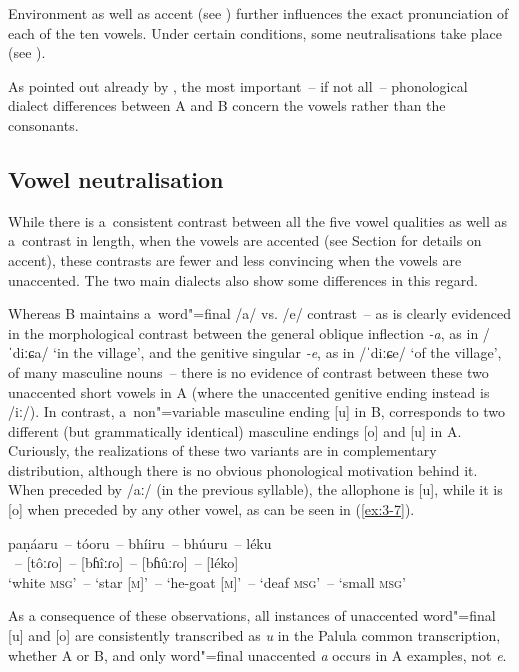 Environment as well as accent (see ) further influences the exact pronunciation of each of the ten vowels. Under certain conditions, some neutralisations take place (see ). 


As pointed out already by \citet[58]{morgenstierne1932}, the most important~-- if not all~-- phonological dialect differences between A and B concern the vowels rather than the consonants. 

\subsection{Vowel neutralisation}
\label{subsec:3-2-2}

While there is a~consistent contrast between all the five vowel qualities as well as a~contrast in length, when the vowels are accented (see Section  for details on accent), these contrasts are fewer and less convincing when the vowels are unaccented. The two main dialects also show some differences in this regard. 


Whereas B maintains a~word"=final /a/ vs. /e/ contrast~-- as is clearly evidenced in the morphological contrast between the general oblique inflection \textit{-a}, as in /ˈdiːɕa/ `in the village', and the genitive singular \textit{-e}, as in /ˈdiːɕe/ `of the village', of many masculine nouns~-- there is no evidence of contrast between these two unaccented short vowels in A (where the unaccented genitive ending instead is /iː/). In contrast, a~non"=variable masculine ending [u] in B, corresponds to two different (but grammatically identical) masculine endings [o] and [u] in A. Curiously, the realizations of these two variants are in complementary distribution, although there is no obvious phonological motivation behind it. When preceded by /aː/ (in the previous syllable), the allophone is [u], while it is [o] when preceded by any other vowel, as can be seen in (\ref{ex:3-7}).

\begin{exe}
\ex
\label{ex:3-7}
\gll paṇáaru~-- tóoru~-- bhíiru~-- bhúuru~--  léku \\
[paɳâːɾu]~-- [tôːɾo]~-- [bɦîːɾo]~-- [bɦûːɾo]~-- [léko] \\ 
\glt `white \textsc{msg}'~-- `star [\textsc{m}]'~-- `he-goat [\textsc{m}]'~-- `deaf \textsc{msg}'~-- `small \textsc{msg}'
\end{exe}

As a consequence of these observations, all instances of unaccented word"=final [u] and [o] are consistently transcribed as \textit{u} in the Palula common transcription, whether A or B, and only word"=final unaccented \textit{a} occurs in A examples, not \textit{e}.



